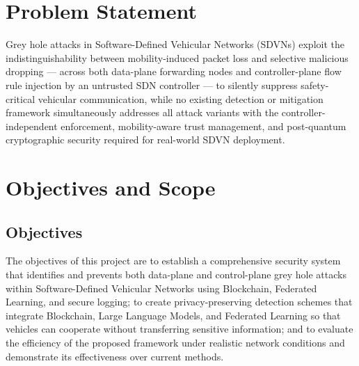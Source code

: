 \documentclass[12pt, a4paper]{report}
\begin{document}
\section{Problem Statement}

Grey hole attacks in Software-Defined Vehicular Networks (SDVNs) exploit the
indistinguishability between mobility-induced packet loss and selective malicious dropping — across both data-plane forwarding nodes and controller-plane flow rule injection by an untrusted SDN controller — to silently suppress safety-critical vehicular communication, while no existing detection or mitigation framework simultaneously addresses all attack variants with the controller-independent enforcement, mobility-aware trust management, and post-quantum cryptographic security required for real-world SDVN deployment.

\section{Objectives and Scope}

\subsection{Objectives}

The objectives of this project are to establish a comprehensive security system that identifies and prevents both data-plane and control-plane grey hole attacks within Software-Defined Vehicular Networks using Blockchain, Federated Learning, and secure logging; to create privacy-preserving detection schemes that integrate Blockchain, Large Language Models, and Federated Learning so that vehicles can cooperate without transferring sensitive information; and to evaluate the efficiency of the proposed framework under realistic network conditions and demonstrate its effectiveness over current methods.
\end{document}
